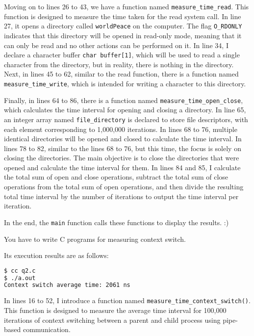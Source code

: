 \documentclass[10pt, answers]{exam}
\begin{document}
\begin{questions}
\begin{solution}
Moving on to lines 26 to 43, we have a function named \texttt{measure\_time\_read}. This function is designed to measure the time taken for the read system call. In line 27, it opens a directory called \texttt{worldPeace} on the computer. The flag \texttt{O\_RDONLY} indicates that this directory will be opened in read-only mode, meaning that it can only be read and no other actions can be performed on it. In line 34, I declare a character buffer \texttt{char buffer[1]}, which will be used to read a single character from the directory, but in reality, there is nothing in the directory. Next, in lines 45 to 62, similar to the read function, there is a function named \texttt{measure\_time\_write}, which is intended for writing a character to this directory.

Finally, in lines 64 to 86, there is a function named \texttt{measure\_time\_open\_close}, which calculates the time interval for opening and closing a directory. In line 65, an integer array named \texttt{file\_directory} is declared to store file descriptors, with each element corresponding to 1,000,000 iterations. In lines 68 to 76, multiple identical directories will be opened and closed to calculate the time interval. In lines 78 to 82, similar to the lines 68 to 76, but this time, the focus is solely on closing the directories. The main objective is to close the directories that were opened and calculate the time interval for them. In lines 84 and 85, I calculate the total sum of open and close operations, subtract the total sum of close operations from the total sum of open operations, and then divide the resulting total time interval by the number of iterations to output the time interval per iteration.

In the end, the \texttt{main} function calls these functions to display the results. :)



\end{solution}

\question 
You have to write C programs for measuring context switch.

\begin{solution}



Its execution results are as follows:

\begin{lstlisting}[language=bash]
$ cc q2.c
$ ./a.out
Context switch average time: 2061 ns
\end{lstlisting}
In lines 16 to 52, I introduce a function named \texttt{measure\_time\_context\_switch()}. This function is designed to measure the average time interval for 100,000 iterations of context switching between a parent and child process using pipe-based communication. 


\end{solution}
\end{questions}
\end{document}
